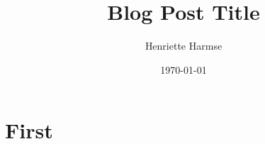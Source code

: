 \documentclass{amsart}
\title{Blog Post Title}
\author{Henriette Harmse}
\date{\today}
\begin{document}
  \maketitle
  \section{First}
  \cite{Aameri2015}

  
  
  
 
\end{document}
